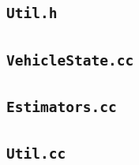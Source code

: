 \documentclass[11pt]{article}
\begin{document}
\subsection{\texttt{Util.h}}


\subsection{\texttt{VehicleState.cc}}


\subsection{\texttt{Estimators.cc}}


\subsection{\texttt{Util.cc}}

\end{document}
